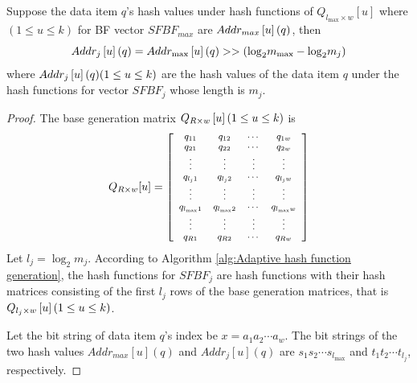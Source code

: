 \documentclass[10pt,journal,compsoc]{IEEEtran}
\newtheorem{proof}{Proof}
\begin{document}
\begin{theorem}
\label{th:hash address}
Suppose the data item $q$'s hash values under hash functions of ${Q_{{l_{\max }} \times w}}[u]$ where $(1 \le u \le k)$ for BF vector $SFBF_{max}$ are $Add{r_{max}}\left[ u \right]{\rm{ }}(q)$, then
\begin{equation}
\small
Add{r_j}\left[ u \right](q) = Add{r_{\max }}\left[ u \right](q) >  > ({\log _2}{m_{\max }} - {\log _2}{m_j})
\label{eq:false whole}
\end{equation}
where $Add{r_j}\left[ u \right](q){\rm{ }}({\rm{1}} \le u \le k)$ are the hash values of the data item $q$ under the hash functions for vector $SFBF_j$ whose length is $m_j$.
\end{theorem}
\begin{proof}
The base generation matrix ${Q_{R \times w}}\left[ u \right]{\rm{ }}({\rm{1}} \le u \le k)$ is
\begin{equation}
\scriptsize
{Q_{R \times w}}[u] = \left[ {\begin{array}{*{20}{c}}
   {{q_{11}}} & {{q_{12}}} &  \cdots  & {{q_{1w}}}  \\
   {{q_{21}}} & {{q_{22}}} &  \cdots  & {{q_{2w}}}  \\
    \vdots  &  \vdots  &  \vdots  &  \vdots   \\
   {{q_{{l_j}1}}} & {{q_{{l_j}2}}} &  \cdots  & {{q_{{l_j}w}}}  \\
    \vdots  &  \vdots  &  \vdots  &  \vdots   \\
   {{q_{{l_{\max }}1}}} & {{q_{{l_{\max }}2}}} &  \cdots  & {{q_{{l_{\max }}w}}}  \\
    \vdots  &  \vdots  &  \vdots  &  \vdots   \\
   {{q_{R1}}} & {{q_{R2}}} &  \cdots  & {{q_{Rw}}}  \\
\end{array}} \right]
\end{equation}
Let ${l_j} = {\log _2}{m_j}$. According to Algorithm \ref{alg:Adaptive hash function generation}, the hash functions for $SFBF_j$ are hash functions with their hash matrices consisting of the first $l_j$ rows of the base generation matrices, that is ${Q_{{l_j} \times w}}\left[ u \right]{\rm{ }}({\rm{1}} \le u \le k)$.

Let the bit string of data item $q$'s index be $x = {a_1}{a_2} \cdots {a_w}$. The bit strings of the two hash values $Add{r_{max}\left[ u \right] (q)}$ and $Add{r_{j}\left[ u \right] (q)}$ are  ${s_1}{s_2} \cdots s_{l_{\max }}$ and ${t_1}{t_2} \cdots t_{l_j}$, respectively.



\end{proof}
\end{document}
